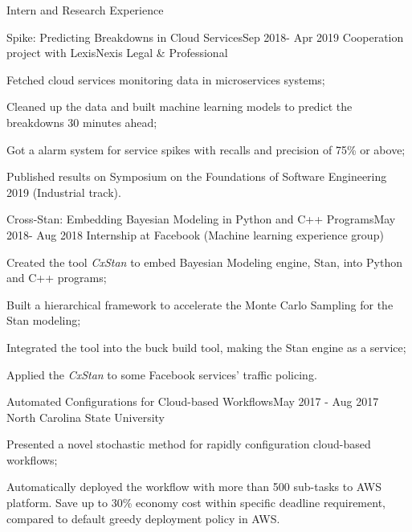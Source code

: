 \documentclass{resume} %
\begin{document}

\begin{rSection}{Intern and Research Experience}
\begin{rSubsection}{Spike: Predicting Breakdowns in Cloud Services}{Sep 2018- Apr 2019}
{Cooperation project with LexisNexis Legal \& Professional}{}
\item Fetched cloud services monitoring data in microservices systems;
\item Cleaned up the data and built machine learning models to predict the breakdowns 30 minutes ahead;
\item Got a alarm system for service spikes with recalls and precision of 75\% or above;
\item Published results on Symposium on the Foundations of Software Engineering 2019 (Industrial track).
\end{rSubsection}


\begin{rSubsection}{Cross-Stan: Embedding Bayesian Modeling in Python and C++ Programs}{May 2018- Aug 2018}
{Internship at Facebook (Machine learning experience group)}{}
\item Created the tool {\it CxStan} to embed Bayesian Modeling engine, Stan, into Python and C++ programs;
\item Built a hierarchical framework to accelerate the  Monte Carlo Sampling for the Stan modeling;
\item Integrated the tool into the buck build tool, making the Stan engine as a service;
\item Applied the {\it CxStan} to some Facebook services' traffic policing.
\end{rSubsection}

\begin{rSubsection}{Automated Configurations for Cloud-based Workflows}{May 2017 - Aug 2017}
{North Carolina State University}{}
\item Presented a novel stochastic method for rapidly configuration cloud-based workflows;
\item Automatically deployed the workflow with more than 500 sub-tasks to AWS platform. Save up to 30\% economy cost within specific deadline requirement, compared to default greedy deployment policy in AWS.
\end{rSubsection}


\end{rSection}
\end{document}
